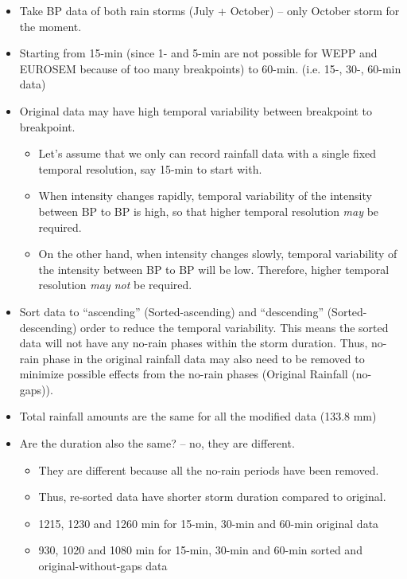 \begin{itemize}
  \item Take BP data of both rain storms (July + October) -- only October storm
for the moment.
  \item Starting from 15-min (since 1- and 5-min are not possible for WEPP and
EUROSEM because of too many breakpoints) to 60-min. (i.e. 15-, 30-, 60-min data)
  \item Original data may have high temporal variability between breakpoint to
breakpoint.
    \begin{itemize}
      \item Let's assume that we only can record rainfall data with a single
fixed temporal resolution, say 15-min to start with.
      \item When intensity changes rapidly, temporal variability of the
intensity between BP to BP is high, so that higher temporal resolution
\emph{may} be required.
      \item On the other hand, when intensity changes slowly, temporal
variability of the intensity between BP to BP will be low. Therefore, higher
temporal resolution \emph{may not} be required.
    \end{itemize}
  \item Sort data to ``ascending'' (Sorted-ascending) and ``descending''
(Sorted-descending) order to reduce the temporal variability. This means the
sorted data will not have any no-rain phases within the storm duration. Thus,
no-rain phase in the original rainfall data may also need to be removed to
minimize possible effects from the no-rain phases (Original Rainfall (no-gaps)).
  \item Total rainfall amounts are the same for all the modified data (133.8 mm)
  \item Are the duration also the same? -- no, they are different.
    \begin{itemize}
      \item They are different because all the no-rain periods have been
removed.
      \item Thus, re-sorted data have shorter storm duration compared to
original.
      \item 1215, 1230 and 1260 min for 15-min, 30-min and 60-min original data
      \item 930, 1020 and 1080 min for 15-min, 30-min and 60-min sorted and
original-without-gaps data
    \end{itemize}
\end{itemize}

